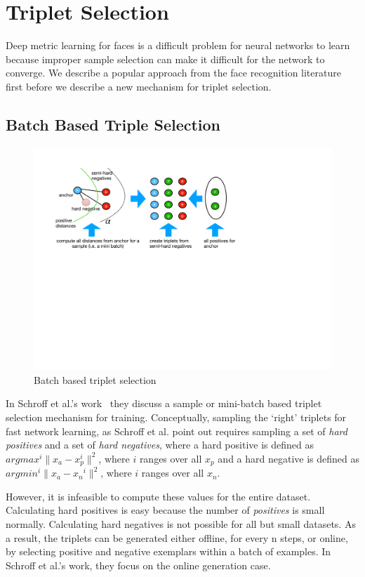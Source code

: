 \section{Triplet Selection}
Deep metric learning for faces is a difficult problem for neural networks to learn because improper sample selection can make it difficult for the network to converge.  We describe a popular approach from the face recognition literature first before we describe a new mechanism for triplet selection.

\subsection{Batch Based Triple Selection}
\begin{figure}
\includegraphics[width=1.0\linewidth]{triplet_selection}
\caption{Batch based triplet selection}
\label{triplet_selection}
\end{figure}

In Schroff et al.'s work~\cite{DBLP:conf/cvpr/SchroffKP15} they discuss a sample or mini-batch based triplet selection mechanism for training.  Conceptually, sampling the `right' triplets for fast network learning, as Schroff et al. point out requires sampling a set of \textit{hard positives} and a set of \textit{hard negatives}, where a hard positive is defined as $argmax^i \| x_{a} - x_{p}^i \|^2$, where $i$ ranges over all $x_p$ and a hard negative is defined as $argmin^i \| x_{a} - x{_n}^i \|^2$, where $i$ ranges over all $x_n$. 

However, it is infeasible to compute these values for the entire dataset.  Calculating hard positives is easy because the number of \textit{positives} is small normally.  Calculating hard negatives is not possible for all but small datasets.  As a result, the triplets can be generated either offline, for every n steps, or online, by selecting positive and negative exemplars within a batch of examples.  In Schroff et al.'s work, they focus on the online generation case.  

